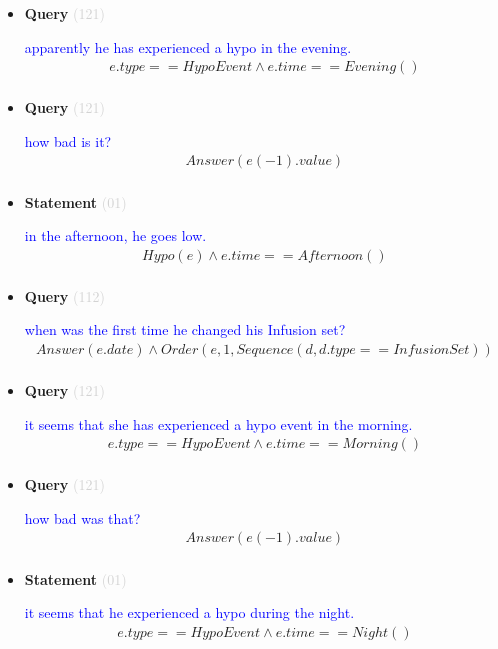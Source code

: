 \documentclass[11pt]{article}
\newcommand{\key}[1]{\textcolor{lightgray}{#1}}
\newcounter{CQuery}
\newcounter{CStatement}
\begin{document}
\begin{itemize}
\item
\textbf{Query\theCQuery} \key{(121)} \addtocounter{CQuery}{1}
\textcolor{blue}{ apparently he has experienced a hypo in the evening. }
\begin{multline*}
e.type==HypoEvent \wedge e.time==Evening() \\ 
\end{multline*}


\item
\textbf{Query\theCQuery} \key{(121)} \addtocounter{CQuery}{1}
\textcolor{blue}{ how bad is it? }
\begin{multline*}
Answer(e(-1).value) \\ 
\end{multline*}


\item
\textbf{Statement\theCStatement} \key{(01)} \addtocounter{CStatement}{1}
\textcolor{blue}{ in the afternoon, he goes low. }
\begin{multline*}
Hypo(e) \wedge e.time==Afternoon() \\ 
\end{multline*}


\item
\textbf{Query\theCQuery} \key{(112)} \addtocounter{CQuery}{1}
\textcolor{blue}{ when was the first time he changed his Infusion set? }
\begin{multline*}
Answer(e.date) \wedge Order(e, 1, Sequence(d, d.type==InfusionSet)) \\ 
\end{multline*}


\item
\textbf{Query\theCQuery} \key{(121)} \addtocounter{CQuery}{1}
\textcolor{blue}{ it seems that she has experienced a hypo event in the morning. }
\begin{multline*}
e.type==HypoEvent \wedge e.time==Morning() \\ 
\end{multline*}


\item
\textbf{Query\theCQuery} \key{(121)} \addtocounter{CQuery}{1}
\textcolor{blue}{ how bad was that? }
\begin{multline*}
Answer(e(-1).value) \\ 
\end{multline*}


\item
\textbf{Statement\theCStatement} \key{(01)} \addtocounter{CStatement}{1}
\textcolor{blue}{ it seems that he experienced a hypo during the night. }
\begin{multline*}
e.type==HypoEvent \wedge e.time==Night() \\ 
\end{multline*}



\end{itemize}
\end{document}
